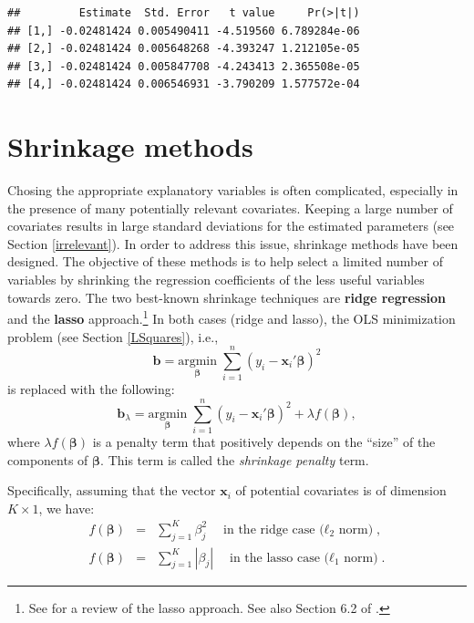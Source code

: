 \documentclass[
  12pt,
]{book}
\theoremstyle{definition}
\theoremstyle{definition}
\theoremstyle{definition}
\theoremstyle{definition}
\theoremstyle{remark}
\begin{document}
\begin{verbatim}
##         Estimate  Std. Error   t value     Pr(>|t|)
## [1,] -0.02481424 0.005490411 -4.519560 6.789284e-06
## [2,] -0.02481424 0.005648268 -4.393247 1.212105e-05
## [3,] -0.02481424 0.005847708 -4.243413 2.365508e-05
## [4,] -0.02481424 0.006546931 -3.790209 1.577572e-04
\end{verbatim}

\hypertarget{shrinkage-methods}{%
\section{Shrinkage methods}\label{shrinkage-methods}}

Chosing the appropriate explanatory variables is often complicated, especially in the presence of many potentially relevant covariates. Keeping a large number of covariates results in large standard deviations for the estimated parameters (see Section \ref{irrelevant}). In order to address this issue, shrinkage methods have been designed. The objective of these methods is to help select a limited number of variables by shrinking the regression coefficients of the less useful variables towards zero. The two best-known shrinkage techniques are \textbf{ridge regression} and the \textbf{lasso} approach.\footnote{See \citet{Tibshirani_2011} for a review of the lasso approach. See also Section 6.2 of \citet{James2013}.} In both cases (ridge and lasso), the OLS minimization problem (see Section \ref{LSquares}), i.e.,
\begin{equation}
\mathbf{b} = \underset{\boldsymbol\beta}{\mbox{argmin}}\; \sum_{i=1}^n(y_i - \mathbf{x}_i'\boldsymbol\beta)^2
\end{equation}
is replaced with the following:
\begin{equation}
\mathbf{b}_\lambda = \underset{\boldsymbol\beta}{\mbox{argmin}}\; \sum_{i=1}^n(y_i - \mathbf{x}_i'\boldsymbol\beta)^2 + \lambda f(\boldsymbol\beta),\label{eq:minLasso}
\end{equation}
where \(\lambda f(\boldsymbol\beta)\) is a penalty term that positively depends on the ``size'' of the components of \(\boldsymbol\beta\). This term is called the \emph{shrinkage penalty} term.

Specifically, assuming that the vector \(\mathbf{x}_i\) of potential covariates is of dimension \(K \times 1\), we have:
\begin{eqnarray*}
f(\boldsymbol\beta) & = & \sum_{j=1}^K \beta_j^2 \quad \mbox{in the ridge case ($\ell_2$ norm)},\\
f(\boldsymbol\beta) & = & \sum_{j=1}^K |\beta_j| \quad \mbox{in the lasso case ($\ell_1$ norm)}.
\end{eqnarray*}
\end{document}
